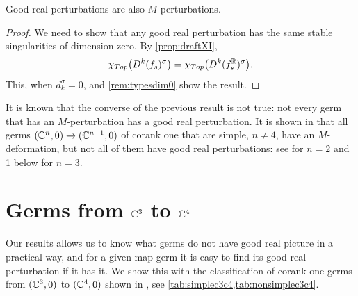 \documentclass[a4paper,12pt]{amsart}
\begin{document}
\begin{proposition}
Good real perturbations are also $M$-perturbations.
\end{proposition}
\begin{proof}
We need to show that any good real perturbation has the same stable singularities of dimension zero. By \cref{prop:draftXI},
\[ \chi_{Top}\big(D^k(f_s)^\sigma\big)=\chi_{Top}\big(D^k(f_s^{\mathbb{R}})^\sigma\big).\]
This, when $d_k^\sigma=0$, and \cref{rem:typesdim0} show the result.
\end{proof}

\begin{remark}
It is known that the converse of the previous result is not true: not every germ that has an $M$-perturbation has a good real perturbation. It is shown in \cite[Theorem 2.1]{Rieger2008a} that all germs $(\mathbb{C}^n,0)\to(\mathbb{C}^{n+1},0)$ of corank one that are simple, $n\neq 4$, have an $M$-deformation, but not all of them have good real perturbations: see \cite{Marar1996} for $n=2$ and  \cref{sec:C3C4} below for $n=3$.
\end{remark}


\section{Germs from $\mathbb{C}^3$ to $\mathbb{C}^4$}\label{sec:C3C4}

Our results allows us to know what germs do not have good real picture in a practical way, and for a given map germ it is easy to find its good real perturbation if it has it. We show this with the classification of corank one germs from $(\mathbb{C}^3,0)$ to $(\mathbb{C}^4,0)$ shown in \cite{Houston1999a}, see \cref{tab:simplec3c4,tab:nonsimplec3c4}.
\end{document}
